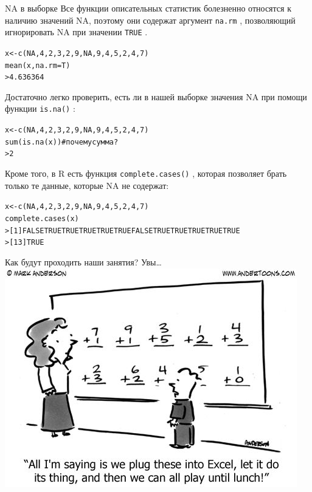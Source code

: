 \begin{frame}{NA в выборке}
\alert{Все функции описательных статистик}  болезненно относятся к наличию значений NA, поэтому они содержат аргумент \scriptsize \alert{\verb"na.rm"} \normalsize, позволяющий игнорировать NA при значении \scriptsize \verb"TRUE" \normalsize. \\
\scriptsize
\begin{alltt}
x <- c(\alert{NA}, 4, 2, 3, 2, 9, \alert{NA}, 9, 4, 5, 2, 4, 7)\\
mean(x, \alert{na.rm = T}) \\
> 4.636364 
\end{alltt}
\normalsize
\vfill
Достаточно легко проверить, есть ли в нашей выборке значения NA при помощи функции \scriptsize \alert{\verb"is.na()"} \normalsize:
\scriptsize
\begin{alltt}
x <- c(\alert{NA}, 4, 2, 3, 2, 9, \alert{NA}, 9, 4, 5, 2, 4, 7)\\
sum(\alert{is.na(}x\alert{)}) \hfill \# почему сумма?\\
> 2                                                                                                    
\end{alltt}
\normalsize
\vfill
Кроме того, в R есть функция \scriptsize \alert{\verb"complete.cases()"} \normalsize, которая позволяет брать только те данные, которые NA не содержат:
\scriptsize
\begin{alltt}
x <- c(\alert{NA}, 4, 2, 3, 2, 9, \alert{NA}, 9, 4, 5, 2, 4, 7)\\
\alert{complete.cases(}x\alert{)}\\
> [1] \alert{FALSE}  TRUE  TRUE  TRUE  TRUE  TRUE \alert{FALSE}  TRUE  TRUE  TRUE  TRUE TRUE 
> [13] TRUE                                                          
\end{alltt}
\normalsize
\end{frame}
\begin{frame}{Как будут проходить наши занятия? Увы\dots}
\includegraphics[width=\linewidth]{easy.jpg}
\end{frame}
